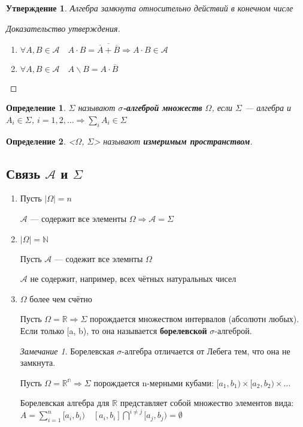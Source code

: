\documentclass[10pt,a4paper,oneside,titlepage]{book}
\theoremstyle{plain}
\newtheorem{predl}{Утверждение}
\theoremstyle{defenition}
\newtheorem{defenition}{Определение}[section]
\theoremstyle{remark}
\newtheorem*{remark}{Замечание}
\begin{document}
\begin{predl}
	Алгебра замкнута относительно действий в конечном числе
\end{predl}
\begin{proof}[Доказательство утверждения]
	\begin{enumerate}
		\item $\forall A,B\in\mathcal{A}\quad A\cdot B=\overline{\overline{A}+\overline{B}}\Rightarrow A\cdot B\in\mathcal{A}$
		\item $\forall A,B\in\mathcal{A}\quad A\backslash B=A\cdot\overline{B}$
	\end{enumerate}
\end{proof}

\begin{defenition}
	$\Sigma$ называют {\bfseries$\sigma$-алгеброй множеств} $\Omega$, если $\Sigma$ --- алгебра и $A_i\in\Sigma$, $i=1, 2, \ldots \Rightarrow\sum\limits_iA_i\in\Sigma$
\end{defenition}

\begin{defenition}
	<$\Omega$, $\Sigma$> называют {\bfseries измеримым пространством}.
\end{defenition}

\subsection{Связь $\mathcal{A}$ и $\Sigma$}

\begin{enumerate}
	\item Пусть $|\Omega|=n$
	
	$\mathcal{A}$ --- содержит все элементы $\Omega \Rightarrow \mathcal{A}=\Sigma$
	\item $|\Omega|=\mathbb{N}$
	
	Пусть $\mathcal{A}$ --- содежит все элемнты $\Omega$
	
	$\mathcal{A}$ не содержит, например, всех чётных натуральных чисел
	\item $\Omega$ более чем счётно
	
	Пусть $\Omega=\mathbb{R}\Rightarrow\Sigma$ порождается множеством интервалов (абсолютн любых). Если только [a, b), то она называется {\bfseries борелевской} $\sigma$-алгеброй.
	\begin{remark}
		Борелевская $\sigma$-алгебра отличается от Лебега тем, что она не замкнута.
	\end{remark}
    Пусть $\Omega=\mathbb{R^n}\Rightarrow\Sigma$ порождается n-мерными кубами: $[a_1, b_1)\times[a_2,b_2)\times\ldots$
    
    Борелевская алгебра для $\mathbb{R}$ представляет собой множество элементов вида: $A=\sum\limits_{i=1}^n[a_i,b_i)\quad[a_i,b_i]\bigcap\limits^{i\ne j}[a_j,b_j)=\emptyset$
\end{enumerate}
\end{document}
